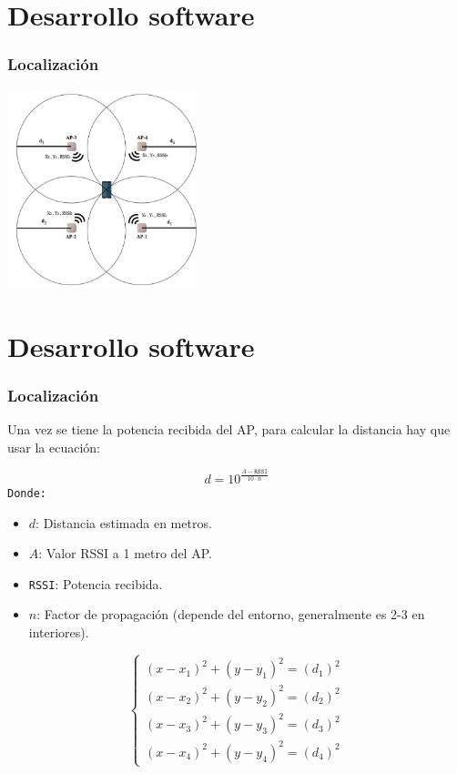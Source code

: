 \documentclass{beamer}
\begin{document}
\section{Desarrollo software}
\begin{frame}
\frametitle{Localización}
\centering
\begin{minipage}{0.45\textwidth}
    \centering
    \includegraphics[width=5.5cm]{figs/trilateration.png}
\end{minipage}


\end{frame}

\section{Desarrollo software}
\begin{frame}
\frametitle{Localización}
\centering
Una vez se tiene la potencia recibida del AP, para calcular la distancia hay que usar la ecuación:


\begin{equation}
d = 10^{\frac{A - \texttt{RSSI}}{10 \cdot n}}
\label{ec:ec2}
\end{equation}
\texttt{Donde:}
\begin{itemize}
    \item $d$: Distancia estimada en metros.
    \item $A$: Valor RSSI a 1 metro del AP.
    \item \texttt{RSSI}: Potencia recibida.
    \item $n$: Factor de propagación (depende del entorno, generalmente es 2-3 en interiores).
\end{itemize}
\vspace{-0.3cm} %
\begin{equation}
\left\{
	\begin{array}{lcc}
		(x - x_1)^2 + (y - y_1)^2 = (d_1)^2\\
		(x - x_2)^2 + (y - y_2)^2 = (d_2)^2\\
		(x - x_3)^2 + (y - y_3)^2 = (d_3)^2 \\
		(x - x_4)^2 + (y - y_4)^2 = (d_4)^2
	\end{array}
\right.
\label{ec:ec5}
\end{equation}

\end{frame}
\end{document}
